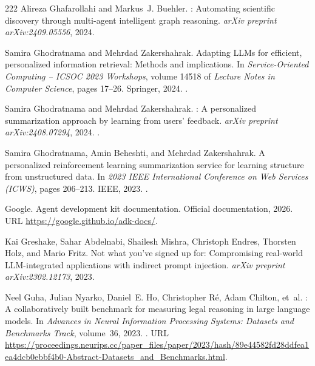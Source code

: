 \begin{thebibliography}{222}
Alireza Ghafarollahi and Markus~J. Buehler.
: Automating scientific discovery through multi-agent
  intelligent graph reasoning.
\newblock \emph{arXiv preprint arXiv:2409.05556}, 2024.

Samira Ghodratnama and Mehrdad Zakershahrak.
\newblock Adapting {LLM}s for efficient, personalized information retrieval:
  Methods and implications.
\newblock In \emph{Service-Oriented Computing -- {ICSOC} 2023 Workshops},
  volume 14518 of \emph{Lecture Notes in Computer Science}, pages 17--26.
  Springer, 2024{}.
\newblock {}.

Samira Ghodratnama and Mehrdad Zakershahrak.
: A personalized summarization approach by learning from
  users' feedback.
\newblock \emph{arXiv preprint arXiv:2408.07294}, 2024{}.
\newblock {}.

Samira Ghodratnama, Amin Beheshti, and Mehrdad Zakershahrak.
\newblock A personalized reinforcement learning summarization service for
  learning structure from unstructured data.
\newblock In \emph{2023 {IEEE} International Conference on Web Services
  ({ICWS})}, pages 206--213. IEEE, 2023.
\newblock {}.

{Google}.
\newblock Agent development kit documentation.
\newblock Official documentation, 2026.
\newblock URL \url{https://google.github.io/adk-docs/}.

Kai Greshake, Sahar Abdelnabi, Shailesh Mishra, Christoph Endres, Thorsten
  Holz, and Mario Fritz.
\newblock Not what you've signed up for: Compromising real-world
  {LLM}-integrated applications with indirect prompt injection.
\newblock \emph{arXiv preprint arXiv:2302.12173}, 2023.

Neel Guha, Julian Nyarko, Daniel~E. Ho, Christopher R{\'e}, Adam Chilton,
  et~al.
: A collaboratively built benchmark for measuring legal
  reasoning in large language models.
\newblock In \emph{Advances in Neural Information Processing Systems: Datasets
  and Benchmarks Track}, volume~36, 2023.
\newblock {}.
\newblock URL
  \url{https://proceedings.neurips.cc/paper_files/paper/2023/hash/89e44582fd28ddfea1ea4dcb0ebbf4b0-Abstract-Datasets_and_Benchmarks.html}.


\end{thebibliography}
